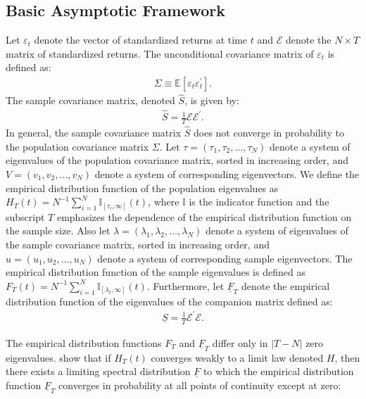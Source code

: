 \subsection{Basic Asymptotic Framework}
Let $\varepsilon_t$ denote the vector of standardized returns at time $t$ and $\mathcal{E}$ denote the $N \times T$ matrix of standardized returns. The unconditional covariance matrix of $\varepsilon_t$ is defined as:
\begin{align}
	\Sigma \equiv \mathbb{E}[ \varepsilon_t \varepsilon_t^\prime ].
\end{align}
The sample covariance matrix, denoted $\widehat{S}$, is given by:
\begin{align}
	\widehat{S} = \frac{1}{T} \mathcal{E}\mathcal{E}^\prime.
\end{align}
In general, the sample covariance matrix $\widehat{S}$ does not converge in probability to the population covariance matrix $\Sigma$. Let $\tau = \left( \tau_{1}, \tau_2, \dots, \tau_N \right)$ denote a system of eigenvalues of the population covariance matrix, sorted in increasing order, and $V = \left( v_1, v_2, \dots , v_N \right)$ denote a system of corresponding eigenvectors. We define the empirical distribution function of the population eigenvalues as $H_T(t) = N^{-1}\sum_{i=1}^N \mathbb{I}_{[\tau_i,\infty]}(t)$, where $\mathbb{I}$ is the indicator function and the subscript $T$ emphasizes the dependence of the empirical distribution function on the sample size. Also let $\lambda = (\lambda_1, \lambda_2, \dots , \lambda_N)$ denote a system of eigenvalues of the sample covariance matrix, sorted in increasing order, and $u = (u_1, u_2, \dots, u_N)$ denote a system of corresponding sample eigenvectors. The empirical distribution function of the sample eigenvalues is defined as $F_T(t) = N^{-1}\sum_{i=1}^N \mathbb{I}_{[\lambda_i, \infty]}(t)$. Furthermore, let $\underline{F}_T$ denote the empirical distribution function of the eigenvalues of the companion matrix defined as:
\begin{align}
	\underline{S} = \frac{1}{T} \mathcal{E}^\prime \mathcal{E}.
\end{align} 

The empirical distribution functions $F_T$ and $\underline{F}_T$ differ only in $|T - N|$ zero eigenvalues. \textcite{MP1967} show that if $H_T(t)$ converges weakly to a limit law denoted $H$, then there exists a limiting spectral distribution $\underline{F}$ to which the empirical distribution function $\underline{F}_T$ converges in probability at all points of continuity except at zero:


